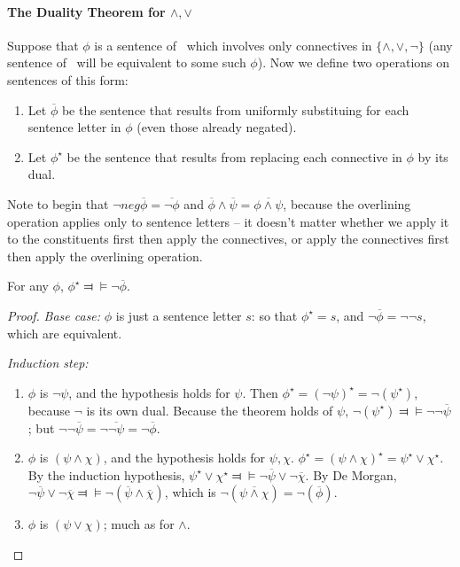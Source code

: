 \paragraph{The Duality Theorem for $\wedge,\vee$}
Suppose that $\phi$ is a sentence of \lone\ which involves only connectives in $\{\wedge,\vee,\neg\}$ (any sentence of \lone\ will be equivalent to some such $\phi$). Now we define two operations on sentences of this form: \begin{enumerate}
	\item Let $\overline{\phi}$ be the sentence that
	results from uniformly substituing  for each sentence letter  in $\phi$ (even those already negated).
	\item Let $\phi^{\star}$ be the sentence that results from replacing each connective in $\phi$ by its dual.
\end{enumerate}
Note to begin that $¬neg\overline{\phi}=\overline{\neg\phi}$ and $\overline{\phi}\wedge\overline{\psi}=\overline{\phi\wedge \psi}$, because the overlining operation applies only to sentence letters – it doesn't matter whether we apply it to the constituents first then apply the connectives, or apply the connectives first then apply the overlining operation.
\begin{lemma}
	For any $\phi$, $\phi^{\star}\Dashv\vDash\neg\overline{\phi}$. 
\begin{proof}
	\emph{Base case:}  $\phi$ is just a sentence
	letter $s$: so that $\phi^{\star} = s$, and $\neg\overline{\phi} = \neg\neg s$, which are equivalent.

	\emph{Induction step:} \begin{enumerate}
		\item $\phi$ is $\neg \psi$, and the hypothesis holds for $\psi$. Then $\phi^{\star} = (\neg \psi)^{\star} = \neg
	    (\psi^{\star})$, because $\neg$ is its own dual. Because the theorem holds of $\psi$, $\neg (\psi^{\star})
	    \Dashv\vDash \neg\neg\overline{\psi}$; but $\neg \neg\overline{\psi} = \neg \overline{\neg\psi} = \neg\overline{\phi}$.
	   	\item $\phi$ is $(\psi \wedge \chi)$, and the hypothesis holds for $\psi,\chi$. $\phi^{\star} = (\psi \wedge \chi)^{\star} = \psi^{\star} \vee
	   \chi^{\star}$. By the induction hypothesis, $\psi^{\star} \vee \chi^{\star}
	   \Dashv\vDash \neg\overline{\psi} \vee \neg \overline{\chi}$. By De
	   Morgan, $\neg\overline{\psi} \vee \neg \overline{\chi} \Dashv\vDash
	   \neg (\overline{\psi} \wedge \overline{\chi})$, which is
	   $\neg(\overline{\psi \wedge \chi}) =\neg(\overline{\phi})$.
		\item $\phi$ is $(\psi \vee \chi)$; much as for $\wedge$. 
	\end{enumerate}
\end{proof}\end{lemma}
